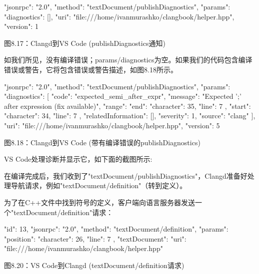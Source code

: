 \begin{shell}
{
  "jsonrpc": "2.0",
  "method": "textDocument/publishDiagnostics",
  "params": {
    "diagnostics": [],
    "uri": "file:///home/ivanmurashko/clangbook/helper.hpp",
    "version": 1
  }
}
\end{shell}


\begin{center}
图8.17：Clangd到VS Code (publishDiagnostics通知)
\end{center}

如我们所见，没有编译错误；params/diagnostics为空。如果我们的代码包含编译错误或警告，它将包含错误或警告描述，如图8.18所示。

\begin{shell}
{
  "jsonrpc": "2.0",
  "method": "textDocument/publishDiagnostics",
  "params": {
    "diagnostics": [
    {
      "code": "expected_semi_after_expr",
      "message": "Expected ';' after expression (fix available)",
      "range": {
        "end": {
          "character": 35,
          "line": 7
        },
        "start": {
          "character": 34,
          "line": 7
        }
      },
      "relatedInformation": [],
      "severity": 1,
      "source": "clang"
    }
    ],
    "uri": "file:///home/ivanmurashko/clangbook/helper.hpp",
    "version": 5
  }
}
\end{shell}

\begin{center}
图8.18：Clangd到VS Code (带有编译错误的publishDiagnostics)
\end{center}

VS Code处理诊断并显示它，如下面的截图所示:


在编译完成后，我们收到了"textDocument/publishDiagnostics"，Clangd准备好处理导航请求，例如"textDocument/definition"（转到定义）。


为了在C++文件中找到符号的定义，客户端向语言服务器发送一个"textDocument/definition"请求：

\begin{shell}
{
  "id": 13,
  "jsonrpc": "2.0",
  "method": "textDocument/definition",
  "params": {
    "position": {
      "character": 26,
      "line": 7
    },
    "textDocument": {
       "uri": "file:///home/ivanmurashko/clangbook/helper.hpp"
    }
  }
}
\end{shell}

\begin{center}
图8.20：VS Code到Clangd (textDocument/definition请求)
\end{center}

